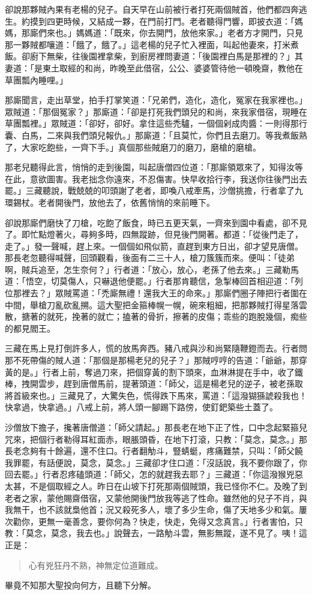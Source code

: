 卻說那夥賊內果有老楊的兒子。自天早在山前被行者打死兩個賊首，他們都四奔逃生。約摸到四更時候，又結成一夥，在門前打門。老者聽得門響，即披衣道：「媽媽，那廝們來也。」媽媽道：「既來，你去開門，放他來家。」老者方才開門，只見那一夥賊都嚷道：「餓了，餓了。」這老楊的兒子忙入裡面，叫起他妻來，打米煮飯。卻廚下無柴，往後園裡拿柴，到廚房裡問妻道：「後園裡白馬是那裡的？」其妻道：「是東土取經的和尚，昨晚至此借宿，公公、婆婆管待他一頓晚齋，教他在草團瓢內睡哩。」

那廝聞言，走出草堂，拍手打掌笑道：「兄弟們，造化，造化，冤家在我家裡也。」眾賊道：「那個冤家？」那廝道：「卻是打死我們頭兒的和尚，來我家借宿，現睡在草團瓢裡。」眾賊道：「卻好，卻好。拿住這些禿驢，一個個剁成肉醬：一則得那行囊、白馬，二來與我們頭兒報仇。」那廝道：「且莫忙，你們且去磨刀。等我煮飯熟了，大家吃飽些，一齊下手。」真個那些賊磨刀的磨刀，磨槍的磨槍。

那老兒聽得此言，悄悄的走到後園，叫起唐僧四位道：「那廝領眾來了，知得汝等在此，意欲圖害。我老拙念你遠來，不忍傷害。快早收拾行李，我送你往後門出去罷。」三藏聽說，戰兢兢的叩頭謝了老者，即喚八戒牽馬，沙僧挑擔，行者拿了九環錫杖。老者開後門，放他去了，依舊悄悄的來前睡下。

卻說那廝們磨快了刀槍，吃飽了飯食，時已五更天氣，一齊來到園中看處，卻不見了。即忙點燈著火，尋夠多時，四無蹤跡，但見後門開著。都道：「從後門走了，走了。」發一聲喊，趕上來。一個個如飛似箭，直趕到東方日出，卻才望見唐僧。那長老忽聽得喊聲，回頭觀看，後面有二三十人，槍刀簇簇而來。便叫：「徒弟啊，賊兵追至，怎生奈何？」行者道：「放心，放心，老孫了他去來。」三藏勒馬道：「悟空，切莫傷人，只嚇退他便罷。」行者那肯聽信，急掣棒回首相迎道：「列位那裡去？」眾賊罵道：「禿廝無禮！還我大王的命來。」那廝們圈子陣把行者圍在中間，舉槍刀亂砍亂搠。這大聖把金箍棒幌一幌，碗來粗細，把那夥賊打得星落雲散，搪著的就死，挽著的就亡；搕著的骨折，擦著的皮傷；乖些的跑脫幾個，痴些的都見閻王。

三藏在馬上見打倒許多人，慌的放馬奔西。豬八戒與沙和尚緊隨鞭鐙而去。行者問那不死帶傷的賊人道：「那個是那楊老兒的兒子？」那賊哼哼的告道：「爺爺，那穿黃的是。」行者上前，奪過刀來，把個穿黃的割下頭來，血淋淋提在手中，收了鐵棒，拽開雲步，趕到唐僧馬前，提著頭道：「師父，這是楊老兒的逆子，被老孫取將首級來也。」三藏見了，大驚失色，慌得跌下馬來，罵道：「這潑猢猻諕殺我也！快拿過，快拿過。」八戒上前，將人頭一腳踢下路傍，使釘鈀築些土蓋了。

沙僧放下擔子，攙著唐僧道：「師父請起。」那長老在地下正了性，口中念起緊箍兒咒來，把個行者勒得耳紅面赤，眼脹頭昏，在地下打滾，只教：「莫念，莫念。」那長老念夠有十餘遍，還不住口。行者翻觔斗，豎蜻蜓，疼痛難禁，只叫：「師父饒我罪罷，有話便說，莫念，莫念。」三藏卻才住口道：「沒話說，我不要你跟了，你回去罷。」行者忍疼磕頭道：「師父，怎的就趕我去耶？」三藏道：「你這潑猴兇惡太甚，不是個取經之人。昨日在山坡下打死那兩個賊頭，我已怪你不仁。及晚了到老者之家，蒙他賜齋借宿，又蒙他開後門放我等逃了性命。雖然他的兒子不肖，與我無干，也不該就梟他首；況又殺死多人，壞了多少生命，傷了天地多少和氣。屢次勸你，更無一毫善念，要你何為？快走，快走，免得又念真言。」行者害怕，只教：「莫念，莫念，我去也。」說聲去，一路觔斗雲，無影無蹤，遂不見了。咦！這正是：
\begin{quote}
心有兇狂丹不熟，神無定位道難成。
\end{quote}

畢竟不知那大聖投向何方，且聽下分解。
